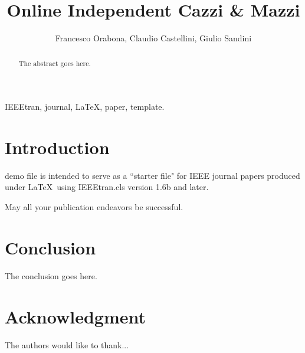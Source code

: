 \documentclass[journal]{IEEEtran}
\begin{document}
\title{Online Independent Cazzi \& Mazzi}

\author{Francesco Orabona, Claudio Castellini, Giulio Sandini}

\maketitle

\begin{abstract}
The abstract goes here.
\end{abstract}

\begin{keywords}
IEEEtran, journal, \LaTeX, paper, template.
\end{keywords}

\section{Introduction}

 demo file is intended to serve as a ``starter file"
for IEEE journal papers produced under \LaTeX\ using IEEEtran.cls version
1.6b and later.

May all your publication endeavors be successful. \cite{kawato-99}

\section{Conclusion}
The conclusion goes here.

\section*{Acknowledgment}
The authors would like to thank...

{\small
  
  
}
\end{document}
